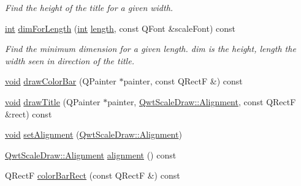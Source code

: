 \begin{DoxyCompactItemize}
\begin{DoxyCompactList}\small\item\em Find the height of the title for a given width. \end{DoxyCompactList}\item 
\hyperlink{ioapi_8h_a787fa3cf048117ba7123753c1e74fcd6}{int} \hyperlink{class_qwt_scale_widget_aa3c1f2f5e60ebb8f6fb42297dfe8881b}{dim\-For\-Length} (\hyperlink{ioapi_8h_a787fa3cf048117ba7123753c1e74fcd6}{int} \hyperlink{glext_8h_a3c8469415bbc83dd1341af15c67f1cef}{length}, const Q\-Font \&scale\-Font) const 
\begin{DoxyCompactList}\small\item\em Find the minimum dimension for a given length. dim is the height, length the width seen in direction of the title. \end{DoxyCompactList}\item 
\hyperlink{group___u_a_v_objects_plugin_ga444cf2ff3f0ecbe028adce838d373f5c}{void} \hyperlink{class_qwt_scale_widget_a6fe4349dce606498a417021e99b65fbf}{draw\-Color\-Bar} (Q\-Painter $\ast$painter, const Q\-Rect\-F \&) const 
\item 
\hyperlink{group___u_a_v_objects_plugin_ga444cf2ff3f0ecbe028adce838d373f5c}{void} \hyperlink{class_qwt_scale_widget_a7daf1650daa5503342721dda62d72243}{draw\-Title} (Q\-Painter $\ast$painter, \hyperlink{class_qwt_scale_draw_acd7ceeeac592ef08530788580b461c66}{Qwt\-Scale\-Draw\-::\-Alignment}, const Q\-Rect\-F \&rect) const 
\item 
\hyperlink{group___u_a_v_objects_plugin_ga444cf2ff3f0ecbe028adce838d373f5c}{void} \hyperlink{class_qwt_scale_widget_ab6421ace2bd56d5559689522336556e0}{set\-Alignment} (\hyperlink{class_qwt_scale_draw_acd7ceeeac592ef08530788580b461c66}{Qwt\-Scale\-Draw\-::\-Alignment})
\item 
\hyperlink{class_qwt_scale_draw_acd7ceeeac592ef08530788580b461c66}{Qwt\-Scale\-Draw\-::\-Alignment} \hyperlink{class_qwt_scale_widget_a96c6c060e258e21e609a0f99e59c5e33}{alignment} () const 
\item 
Q\-Rect\-F \hyperlink{class_qwt_scale_widget_a5271d10cf0e6097a243aa62beb784c02}{color\-Bar\-Rect} (const Q\-Rect\-F \&) const 
\end{DoxyCompactItemize}
